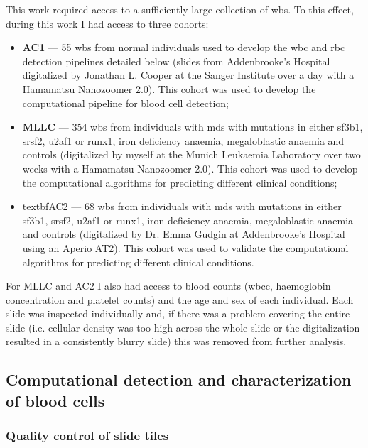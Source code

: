 This work required access to a sufficiently large collection of \ac{wbs}. To this effect, during this work I had access to three cohorts:

\begin{itemize}
    \item \textbf{AC1} --- 55 \ac{wbs} from normal individuals used to develop the \ac{wbc} and \ac{rbc} detection pipelines detailed below (slides from Addenbrooke's Hospital digitalized by Jonathan L. Cooper at the Sanger Institute over a day with a Hamamatsu Nanozoomer 2.0). This cohort was used to develop the computational pipeline for blood cell detection;
    \item \textbf{MLLC} --- 354 \ac{wbs} from individuals with \ac{mds} with mutations in either \ac{sf3b1}, \ac{srsf2}, \ac{u2af1} or \ac{runx1}, iron deficiency anaemia, megaloblastic anaemia and controls (digitalized by myself at the Munich Leukaemia Laboratory over two weeks with a Hamamatsu Nanozoomer 2.0). This cohort was used to develop the computational algorithms for predicting different clinical conditions;
    \item textbf{AC2} --- 68 \ac{wbs} from individuals with \ac{mds} with mutations in either \ac{sf3b1}, \ac{srsf2}, \ac{u2af1} or \ac{runx1}, iron deficiency anaemia, megaloblastic anaemia and controls (digitalized by Dr. Emma Gudgin at Addenbrooke's Hospital using an Aperio AT2). This cohort was used to validate the computational algorithms for predicting different clinical conditions.
\end{itemize}

For MLLC and AC2 I also had access to blood counts (\ac{wbcc}, haemoglobin concentration and platelet counts) and the age and sex of each individual. Each slide was inspected individually and, if there was a problem covering the entire slide (i.e. cellular density was too high across the whole slide or the digitalization resulted in a consistently blurry slide) this was removed from further analysis.

\subsection{Computational detection and characterization of blood cells}

\subsubsection{Quality control of slide tiles}

